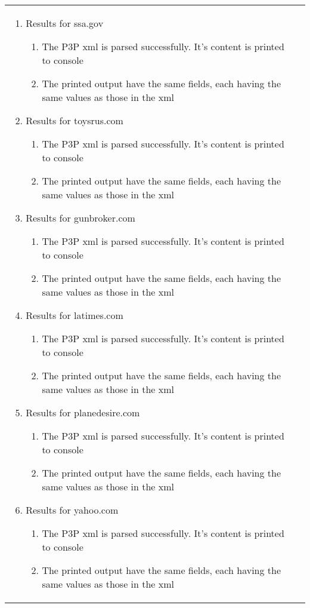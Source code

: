 \begin{center}
\begin{longtable}{ | p{4cm} | p{10cm} | }
\begin{enumerate}
							\item Results for ssa.gov
							\begin{enumerate}
								\item The P3P xml is parsed successfully. It's content is printed to console
								\item The printed output have the same fields, each having the same values as those in the xml
							\end{enumerate}

							\item Results for toysrus.com
							\begin{enumerate}
								\item The P3P xml is parsed successfully. It's content is printed to console
								\item The printed output have the same fields, each having the same values as those in the xml
							\end{enumerate}
							
							\item Results for gunbroker.com
							\begin{enumerate}
								\item The P3P xml is parsed successfully. It's content is printed to console
								\item The printed output have the same fields, each having the same values as those in the xml
							\end{enumerate}

							\item Results for latimes.com
							\begin{enumerate}
								\item The P3P xml is parsed successfully. It's content is printed to console
								\item The printed output have the same fields, each having the same values as those in the xml
							\end{enumerate}

							\item Results for planedesire.com
							\begin{enumerate}
								\item The P3P xml is parsed successfully. It's content is printed to console
								\item The printed output have the same fields, each having the same values as those in the xml
							\end{enumerate}

							\item Results for yahoo.com
							\begin{enumerate}
								\item The P3P xml is parsed successfully. It's content is printed to console
								\item The printed output have the same fields, each having the same values as those in the xml
							\end{enumerate}


\end{enumerate}
\end{longtable}
\end{center}

